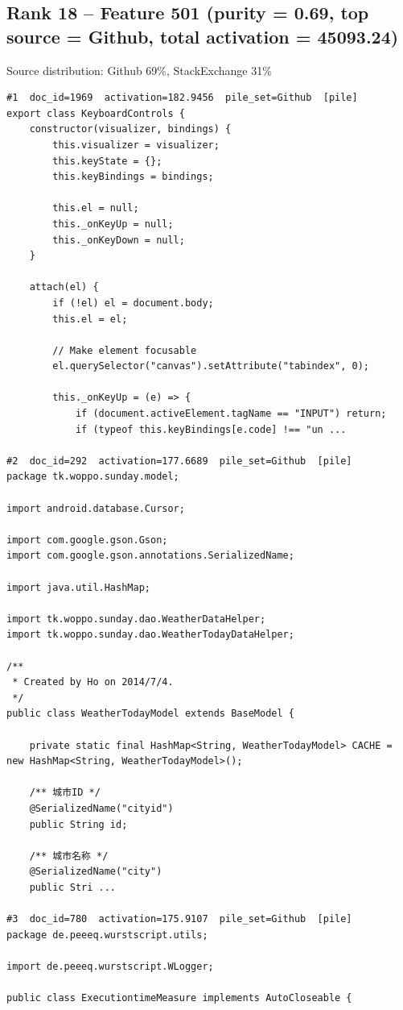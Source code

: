 \subsection*{Rank 18 -- Feature 501 (purity = 0.69, top source = Github, total activation = 45093.24)}

Source distribution: Github 69\%, StackExchange 31\%

\begin{verbatim}
#1  doc_id=1969  activation=182.9456  pile_set=Github  [pile]
export class KeyboardControls {
    constructor(visualizer, bindings) {
        this.visualizer = visualizer;
        this.keyState = {};
        this.keyBindings = bindings;

        this.el = null;
        this._onKeyUp = null;
        this._onKeyDown = null;
    }

    attach(el) {
        if (!el) el = document.body;
        this.el = el;

        // Make element focusable
        el.querySelector("canvas").setAttribute("tabindex", 0);

        this._onKeyUp = (e) => {
            if (document.activeElement.tagName == "INPUT") return;
            if (typeof this.keyBindings[e.code] !== "un ...

#2  doc_id=292  activation=177.6689  pile_set=Github  [pile]
package tk.woppo.sunday.model;

import android.database.Cursor;

import com.google.gson.Gson;
import com.google.gson.annotations.SerializedName;

import java.util.HashMap;

import tk.woppo.sunday.dao.WeatherDataHelper;
import tk.woppo.sunday.dao.WeatherTodayDataHelper;

/**
 * Created by Ho on 2014/7/4.
 */
public class WeatherTodayModel extends BaseModel {

    private static final HashMap<String, WeatherTodayModel> CACHE = new HashMap<String, WeatherTodayModel>();

    /** 城市ID */
    @SerializedName("cityid")
    public String id;

    /** 城市名称 */
    @SerializedName("city")
    public Stri ...

#3  doc_id=780  activation=175.9107  pile_set=Github  [pile]
package de.peeeq.wurstscript.utils;

import de.peeeq.wurstscript.WLogger;

public class ExecutiontimeMeasure implements AutoCloseable {


\end{verbatim}
